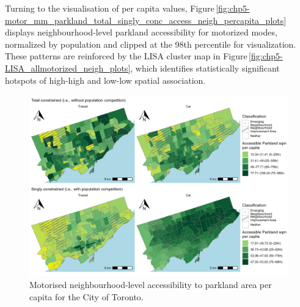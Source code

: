\documentclass[
11pt, %
oneside, %
english, %
singlespacing, %
]{macthesis} %
\begin{document}
Turning to the visualisation of per capita values, Figure\,\ref{fig:chp5-motor_mm_parkland_total_singly_conc_access_neigh_percapita_plots} displays neighbourhood-level parkland accessibility for motorized modes, normalized by population and clipped at the 98th percentile for visualization. These patterns are reinforced by the LISA cluster map in Figure\,\ref{fig:chp5-LISA_allmotorized_neigh_plots}, which identifies statistically significant hotspots of high-high and low-low spatial association.

\begin{figure}

{\centering \includegraphics[width=6in]{./data/figures/chp5-motor_mm_parkland_total_singly_conc_access_neigh_percapita_plots} 

}

\caption{Motorised neighbourhood-level accessibility to parkland area per capita for the City of Toronto.\label{fig:chp5-motor_mm_parkland_total_singly_conc_access_neigh_percapita_plots}}\label{fig:unnamed-chunk-82}
\end{figure}
\end{document}
